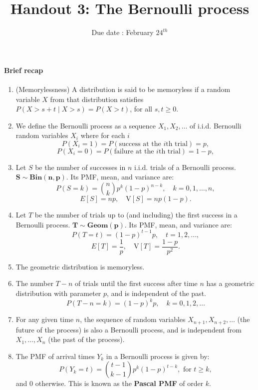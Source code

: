 \documentclass[twocolumn,12pt,a4paper]{article}
\title{ \bfseries \Huge {Handout 3: The Bernoulli process}}
\date{Due date : February $24^{th}$}
\newcounter{num}  %
\begin{document}
	\maketitle
	\setcounter{num}{1}  %
	
	\thispagestyle{empty} 
	\paragraph{Brief recap}
	
	\begin{enumerate}
		\item (Memorylessness) A distribution is said to be memoryless if a random variable $X$ from that distribution satisfies
		$P(X > s + t \mid X > s) = P(X > t)$, for all $s, t \geq 0$.
		\item We define the Bernoulli process as a sequence \( X_1, X_2, \dots \) of i.i.d. Bernoulli random variables \( X_i \) where for each \( i \)
	$$
		P(X_i = 1) = P(\text{success at the } i\text{th trial}) = p,
$$ $$
		P(X_i = 0) = P(\text{failure at the } i\text{th trial}) = 1 - p,
		$$
		
		\item  Let \( S \) be the number of successes in \( n \) i.i.d. trials of a Bernoulli process. \( \mathbf{ S \sim Bin(n,p)}\). 
		Its PMF, mean, and variance are:
		\[
		P(S=k) = \binom{n}{k} p^k (1 - p)^{n-k}, \quad k = 0, 1, \dots, n,
		\]
		\[
		E[S] = np, \quad \text{V}[S] = np(1 - p).
		\]
		\item Let \( T \) be the number of trials up to (and including) the first success in a Bernoulli process. \( \mathbf{ T \sim Geom(p)}\). 
		Its PMF, mean, and variance are:
		\[
		P(T=t) = (1 - p)^{t-1} p, \quad t = 1, 2, \dots,
		\]
		\[
		E[T] = \frac{1}{p}, \quad \text{V}[T] = \frac{1 - p}{p^2}.
		\]
		\item The geometric distribution is memoryless.
		\item  	The number \( T - n \) of trials until the first success after time \( n \) has a geometric distribution with parameter \( p \), and is independent of the past.
		\[
		P(T - n = k) = (1 - p)^k p, \quad k = 0, 1, 2, \dots
		\]
		\item  For any given time \( n \), the sequence of random variables \( X_{n+1}, X_{n+2}, \dots \) (the future of the process) is also a Bernoulli process, and is independent from \( X_1, \dots, X_n \) (the past of the process).
		\item  The PMF of arrival times $Y_k$ in a Bernoulli process is given by:
		\[
		P(Y_k = t) = \binom{t-1}{k-1} p^k (1 - p)^{t-k}, \text{ for } t \geq k,
		\]
		and 0 otherwise.
		This is known as the {\bfseries Pascal PMF} of order $k$.
		\end{enumerate}
	
\end{document}
